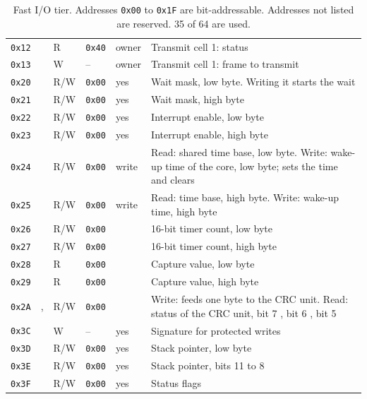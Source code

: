 \begin{table}[H]
\begin{tabularx}{\linewidth}{@{}lllllL@{}}
\texttt{0x12} &  & R & \texttt{0x40} & owner & Transmit cell 1: status \\
\texttt{0x13} &  & W & -- & owner & Transmit cell 1: frame to transmit \\
\texttt{0x20} &  & R/W & \texttt{0x00} & yes & Wait mask, low byte. Writing it starts the wait \\
\texttt{0x21} &  & R/W & \texttt{0x00} & yes & Wait mask, high byte \\
\texttt{0x22} &  & R/W & \texttt{0x00} & yes & Interrupt enable, low byte \\
\texttt{0x23} &  & R/W & \texttt{0x00} & yes & Interrupt enable, high byte \\
\texttt{0x24} &  & R/W & \texttt{0x00} & write & Read: shared time base, low byte. Write: wake-up time of the core, low byte; sets the time and clears  \\
\texttt{0x25} &  & R/W & \texttt{0x00} & write & Read: time base, high byte. Write: wake-up time, high byte \\
\texttt{0x26} &  & R/W & \texttt{0x00} & & 16-bit timer count, low byte \\
\texttt{0x27} &  & R/W & \texttt{0x00} & & 16-bit timer count, high byte \\
\texttt{0x28} &  & R & \texttt{0x00} & & Capture value, low byte \\
\texttt{0x29} &  & R & \texttt{0x00} & & Capture value, high byte \\
\texttt{0x2A} & ,  & R/W & \texttt{0x00} & & Write: feeds one byte to the CRC unit. Read: status of the CRC unit, bit 7 , bit 6 , bit 5  \\
\midrule
\texttt{0x3C} &  & W & -- & yes & Signature for protected writes \\
\texttt{0x3D} &  & R/W & \texttt{0x00} & yes & Stack pointer, low byte \\
\texttt{0x3E} &  & R/W & \texttt{0x00} & yes & Stack pointer, bits 11 to 8 \\
\texttt{0x3F} &  & R/W & \texttt{0x00} & yes & Status flags \\
\bottomrule
\end{tabularx}
\caption{Fast I/O tier. Addresses \texttt{0x00} to \texttt{0x1F} are bit-addressable. Addresses not listed are reserved. 35 of 64 are used.}
\end{table}
